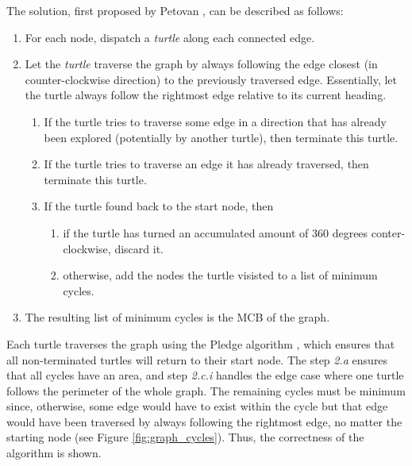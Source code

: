 The solution, first proposed by Petovan \cite{petovan}, can be described as follows:
\vspace{-0.5cm} %
\begin{enumerate}
  \item For each node, dispatch a \textit{turtle} along each connected edge.
  \item Let the \textit{turtle} traverse the graph by always following the edge closest (in counter-clockwise direction) to the previously traversed edge. Essentially, let the turtle always follow the rightmost edge relative to its current heading.
  \begin{enumerate}
    \item If the turtle tries to traverse some edge in a direction that has already been explored (potentially by another turtle), then terminate this turtle.
    \item If the turtle tries to traverse an edge it has already traversed, then terminate this turtle.
    \item If the turtle found back to the start node, then
      \begin{enumerate}
        \item if the turtle has turned an accumulated amount of 360 degrees conter-clockwise, discard it.
        \item otherwise, add the nodes the turtle visisted to a list of minimum cycles.
      \end{enumerate}
  \end{enumerate}
  \item The resulting list of minimum cycles is the MCB of the graph.
\end{enumerate}

Each turtle traverses the graph using the Pledge algorithm \cite{turtle_geometry}, which ensures that all non-terminated turtles will return to their start node.
The step \textit{2.a} ensures that all cycles have an area, and step \textit{2.c.i} handles the edge case where one turtle follows the perimeter of the whole graph.
The remaining cycles must be minimum since, otherwise, some edge would have to exist within the cycle but that edge would have been traversed by always following the rightmost edge, no matter the starting node (see Figure \ref{fig:graph_cycles}).
Thus, the correctness of the algorithm is shown.


